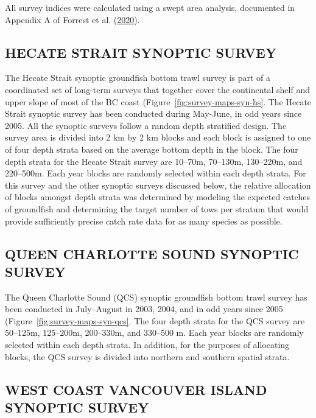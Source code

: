 \documentclass[11pt]{book}
\begin{document}
All survey indices were calculated using a swept area analysis, documented in Appendix A of Forrest et al. (\protect\hyperlink{ref-forrest2020}{2020}).

\hypertarget{hecate-strait-synoptic-survey}{%
\subsection{HECATE STRAIT SYNOPTIC SURVEY}\label{hecate-strait-synoptic-survey}}

The Hecate Strait synoptic groundfish bottom trawl survey is part of a coordinated set of long-term surveys that together cover the continental shelf and upper slope of most of the BC coast (Figure~\ref{fig:survey-maps-syn-hs}. The Hecate Strait synoptic survey has been conducted during May-June, in odd years since 2005. All the synoptic surveys follow a random depth stratified design. The survey area is divided into 2 km by 2 km blocks and each block is assigned to one of four depth strata based on the average bottom depth in the block. The four depth strata for the Hecate Strait survey are 10--70m, 70--130m, 130--220m, and 220--500m. Each year blocks are randomly selected within each depth strata. For this survey and the other synoptic surveys discussed below, the relative allocation of blocks amongst depth strata was determined by modeling the expected catches of groundfish and determining the target number of tows per stratum that would provide sufficiently precise catch rate data for as many species as possible.

\hypertarget{queen-charlotte-sound-synoptic-survey}{%
\subsection{QUEEN CHARLOTTE SOUND SYNOPTIC SURVEY}\label{queen-charlotte-sound-synoptic-survey}}

The Queen Charlotte Sound (QCS) synoptic groundfish bottom trawl survey has been conducted in July--August in 2003, 2004, and in odd years since 2005 (Figure~\ref{fig:survey-maps-syn-qcs}. The four depth strata for the QCS survey are 50--125m, 125--200m, 200--330m, and 330--500 m. Each year blocks are randomly selected within each depth strata. In addition, for the purposes of allocating blocks, the QCS survey is divided into northern and southern spatial strata.

\hypertarget{west-coast-vancouver-island-synoptic-survey}{%
\subsection{WEST COAST VANCOUVER ISLAND SYNOPTIC SURVEY}\label{west-coast-vancouver-island-synoptic-survey}}
\end{document}
